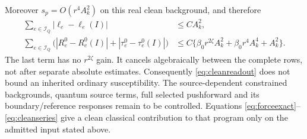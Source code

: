 \documentclass[11pt,letterpaper]{article}
\theoremstyle{remark}\newtheorem{remark}[theorem]{Remark}
\begin{document}
Moreover \(s_p=O(r^4A_k^2)\) on this real clean background, and therefore
\begin{align}\label{eq:ordinaryclean}
 \sum_{e\in\mathcal I_Q}|\ell_e-\ell_e(I)|&\le CA_k^2,\\
 \sum_{e\in\mathcal I_Q}\bigl(
   |R_e^0-R_e^0(I)|+|\tau_e^0-\tau_e^0(I)|\bigr)
 &\le C\{\beta_0r^{2\zeta}A_k^2+
          \beta_0r^4A_k^4+A_k^2\}.\nonumber
\end{align}
The last term has no \(r^{2\zeta}\) gain. It cancels algebraically between the complete rows, not after separate absolute estimates. Consequently \eqref{eq:cleanreadout} does not bound an inherited ordinary susceptibility. The source-dependent constrained backgrounds, quantum source terms, full selected pushforward and its boundary/reference responses remain to be controlled. Equations \eqref{eq:forceexact}--\eqref{eq:cleanseries} give a clean classical contribution to that program only on the admitted input stated above.
\end{document}
